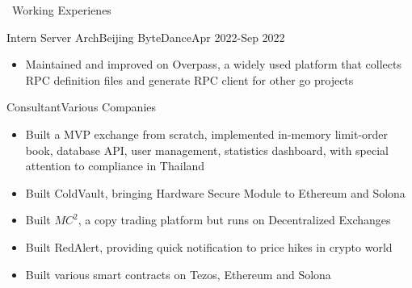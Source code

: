 \documentclass{resume}
\begin{document}
\begin{rSection}{\faUsers~Working Experienes}
\begin{rExperience}{Intern Server Arch}{Beijing ByteDance}{Apr 2022-Sep 2022}
\begin{itemize}
            \item Maintained and improved on Overpass, a widely used platform that collects RPC definition files and generate RPC client for other go projects
        \end{itemize}
    \end{rExperience}
    \begin{rExperience}{Consultant}{Various Companies}{~}
        \begin{itemize}
            \itemsep -0.5em \vspace{-0.5em}
            \item Built a MVP exchange from scratch, implemented in-memory limit-order book, database API, user management, statistics dashboard, with special attention to compliance in Thailand
            \item Built ColdVault, bringing Hardware Secure Module to Ethereum and Solona
            \item Built $MC^{2}$, a copy trading platform but runs on Decentralized Exchanges
            \item Built RedAlert, providing quick notification to price hikes in crypto world
            \item Built various smart contracts on Tezos, Ethereum and Solona
        \end{itemize}
    \end{rExperience}
    

\end{rSection}
\end{document}
